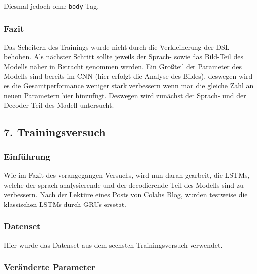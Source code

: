 \documentclass[pdftex,a4paper,halfparskip, article]{scrartcl}
\begin{document}
Diesmal jedoch ohne \texttt{body}-Tag.


\subsubsection*{Fazit}

Das Scheitern des Trainings wurde nicht durch die Verkleinerung der DSL behoben. Als nächster Schritt sollte jeweils der Sprach- sowie das Bild-Teil des Modells näher in Betracht genommen werden. Ein Großteil der Parameter des Modells sind bereits im CNN (hier erfolgt die Analyse des Bildes), deswegen wird es die Gesamtperformance weniger stark verbessern wenn man die gleiche Zahl an neuen Parametern hier hinzufügt. Deswegen wird zunächst der Sprach- und der Decoder-Teil des Modell untersucht.

\subsection{7. Trainingsversuch}


\subsubsection*{Einführung}

Wie im Fazit des vorangegangen Versuchs, wird nun daran gearbeit, die LSTMs, welche der sprach analysierende und der decodierende Teil des Modells sind zu verbessern. Nach der Lektüre eines Posts von Colahs Blog, wurden testweise die klassischen LSTMs durch GRUs ersetzt.

\subsubsection*{Datenset}

Hier wurde das Datenset aus dem sechsten Trainingsversuch verwendet.

\subsubsection*{Veränderte Parameter}
\end{document}
